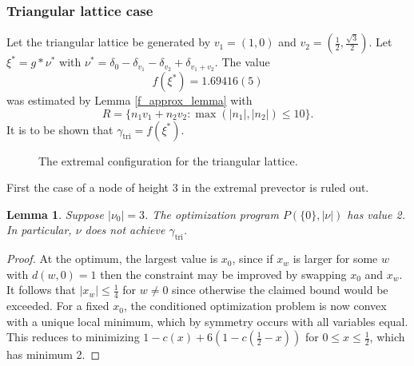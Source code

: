 \documentclass[a4paper, 12pt, notitlepage]{amsart}
\newcommand{\tri}{\operatorname{tri}}
\newtheorem{lemma}[theorem]{Lemma}
\theoremstyle{remark}
\begin{document}
\subsubsection{Triangular lattice case}
Let the triangular lattice be generated by $v_1 = (1,0)$ and $v_2 = \left(\frac{1}{2}, \frac{\sqrt{3}}{2}\right)$.  Let $\xi^* = g* \nu^*$ with $\nu^* = \delta_{0} -\delta_{v_1} - \delta_{v_2} + \delta_{v_1+v_2}$.  The value 
\begin{equation}
 f(\xi^*) = 1.69416(5)
\end{equation}
was estimated by Lemma \ref{f_approx_lemma} with 
\begin{equation}
R = \{n_1 v_1 + n_2 v_2: \max(|n_1|, |n_2|) \leq 10\}.
\end{equation}
   It is to be shown that $\gamma_{\tri} = f(\xi^*)$.
\begin{figure}
\caption{The extremal configuration for the triangular lattice.}\label{fig:triangular_lattice_extremal}
 \end{figure}
 
First the case of a node of height 3 in the extremal prevector is ruled out.  
 \begin{lemma}
  Suppose $|\nu_0| = 3$.  The optimization program $P(\{0\}, |\nu|)$ has value 2. In particular, $\nu$ does not achieve $\gamma_{\tri}$.
 \end{lemma}
\begin{proof}
 At the optimum, the largest value is $x_0$, since if $x_w$ is larger for some $w$ with $d(w,0)=1$ then the constraint may be improved by swapping $x_0$ and $x_w$.  It follows that $|x_w| \leq \frac{1}{4}$ for $w \neq 0$ since otherwise the claimed bound would be exceeded.  For a fixed $x_0$, the conditioned optimization problem is now convex with a unique local minimum, which by symmetry occurs with all variables equal.  This reduces to minimizing $1-c(x) + 6 \left(1 - c\left(\frac{1}{2}-x\right)\right)$ for $0 \leq x \leq \frac{1}{2}$, which has minimum 2.
 
\end{proof}
\end{document}
